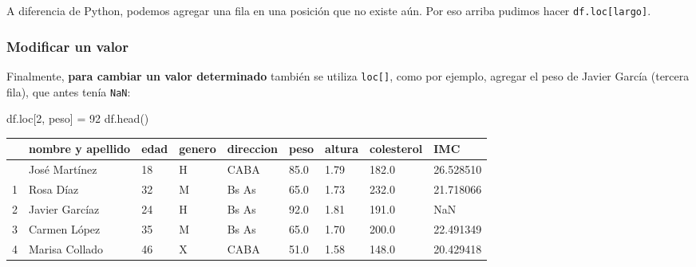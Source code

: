 \documentclass[
  letterpaper,
  DIV=11,
  numbers=noendperiod]{scrreprt}
\newenvironment{Shaded}{\begin{snugshade}}{\end{snugshade}}
\newcommand{\DecValTok}[1]{\textcolor[rgb]{0.68,0.00,0.00}{#1}}
\newcommand{\NormalTok}[1]{\textcolor[rgb]{0.00,0.23,0.31}{#1}}
\newcommand{\OperatorTok}[1]{\textcolor[rgb]{0.37,0.37,0.37}{#1}}
\newcommand{\StringTok}[1]{\textcolor[rgb]{0.13,0.47,0.30}{#1}}
\begin{document}
\begin{tcolorbox}[enhanced jigsaw, opacitybacktitle=0.6, toptitle=1mm, toprule=.15mm, arc=.35mm, breakable, bottomrule=.15mm, opacityback=0, leftrule=.75mm, rightrule=.15mm, title=\textcolor{quarto-callout-note-color}{\faInfo}\hspace{0.5em}{¿Por qué usamos `len' arriba?}, left=2mm, bottomtitle=1mm, colframe=quarto-callout-note-color-frame, colback=white, titlerule=0mm, coltitle=black, colbacktitle=quarto-callout-note-color!10!white]

A diferencia de Python, podemos agregar una fila en una posición que no
existe aún. Por eso arriba pudimos hacer \texttt{df.loc{[}largo{]}}.

\end{tcolorbox}

\subsubsection{Modificar un valor}\label{modificar-un-valor}

Finalmente, \textbf{para cambiar un valor determinado} también se
utiliza \texttt{loc{[}{]}}, como por ejemplo, agregar el peso de Javier
García (tercera fila), que antes tenía \texttt{NaN}:

\begin{Shaded}
\begin{Highlighting}[]
\NormalTok{df.loc[}\DecValTok{2}\NormalTok{, }\StringTok{\textquotesingle{}peso\textquotesingle{}}\NormalTok{] }\OperatorTok{=} \DecValTok{92}
\NormalTok{df.head()}
\end{Highlighting}
\end{Shaded}

\begin{longtable}[]{@{}lllllllll@{}}
\toprule\noalign{}
& nombre y apellido & edad & genero & direccion & peso & altura &
colesterol & IMC \\
\midrule\noalign{}
\endhead
\bottomrule\noalign{}
\endlastfoot
0 & José Martínez & 18 & H & CABA & 85.0 & 1.79 & 182.0 & 26.528510 \\
1 & Rosa Díaz & 32 & M & Bs As & 65.0 & 1.73 & 232.0 & 21.718066 \\
2 & Javier Garcíaz & 24 & H & Bs As & 92.0 & 1.81 & 191.0 & NaN \\
3 & Carmen López & 35 & M & Bs As & 65.0 & 1.70 & 200.0 & 22.491349 \\
4 & Marisa Collado & 46 & X & CABA & 51.0 & 1.58 & 148.0 & 20.429418 \\
\end{longtable}
\end{document}
